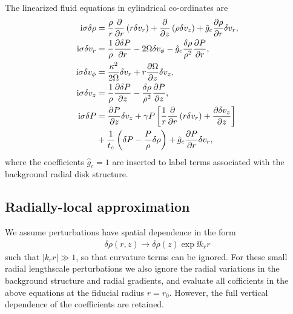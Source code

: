 The linearized fluid equations in cylindrical co-ordinates are  
\begin{align}
  \mathrm{i}\sigma\delta\rho &= \frac{\rho}{r}\frac{\partial}{\partial r}\left(r\delta v_r\right) + \frac{\partial}{\partial
    z}\left(\rho\delta v_z\right)  + \hat{g}_c\frac{\partial\rho}{\partial r}\delta v_r,\\
  \mathrm{i}\sigma\delta v_r &= \frac{1}{\rho}\frac{\partial\delta P}{\partial r} - 2\Omega
  \delta v_\phi - \hat{g}_c\frac{\delta\rho}{\rho^2}\frac{\partial P}{\partial r},\\ 
  \mathrm{i}\sigma\delta v_\phi  &= \frac{\kappa^2}{2\Omega}\delta v_r +
  r\frac{\partial\Omega}{\partial z}\delta v_z,\\
  \mathrm{i} \sigma\delta v_z &= \frac{1}{\rho}\frac{\partial\delta P}{\partial z} -
  \frac{\delta \rho}{\rho^2}\frac{\partial P}{\partial z},\\
  \mathrm{i}\sigma\delta P &=\frac{\partial P}{\partial z}\delta v_z + \gamma P
  \left[\frac{1}{r}\frac{\partial}{\partial r}\left(r\delta v_r\right) + \frac{\partial
      \delta v_z}{\partial z}\right]\notag \\
  &+ \frac{1}{t_c}\left(\delta P -  
    \frac{P}{\rho}\delta\rho\right) + \hat{g}_c \frac{\partial P}{\partial r}\delta v_r,\label{full_energy1}
\end{align}
where the coefficients $\hat{g}_c=1$ are inserted to label terms
associated with the background radial disk structure. 

\subsection{Radially-local approximation}  
We assume perturbations have spatial dependence in the form
\begin{align}
  \delta \rho(r,z) \to \delta\rho(z)\exp{\ii k_r r} 
\end{align}
such that $|k_rr|\gg1$, so that curvature terms can be ignored. For
these small radial lengthscale perturbations we also ignore the radial
variations in the background structure and radial gradients, and
evaluate all cofficients in the above equations at the fiducial radius
$r=r_0$. However, the full vertical dependence of the coefficients are
retained.   

